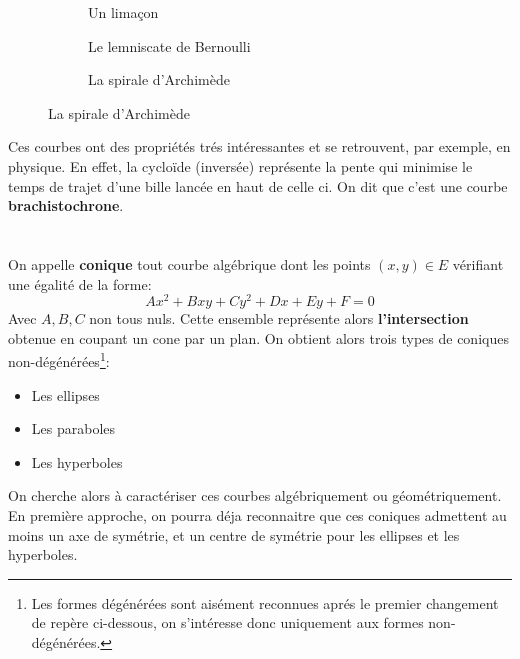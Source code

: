 \begin{figure}[h]
\begin{subfigure}{.3\textwidth}
      \caption*{Un limaçon}
   \end{subfigure}\quad
   \begin{subfigure}{.3\textwidth}
      \centering
      \caption*{Le lemniscate de Bernoulli}
   \end{subfigure}\quad
   \begin{subfigure}{.3\textwidth}
      \centering
      \caption*{La spirale d'Archimède}
   \end{subfigure}\quad
\end{figure}

Ces courbes ont des propriétés trés intéressantes et se retrouvent, par exemple, en physique. En effet, la cycloïde (inversée) représente la pente qui minimise le temps de trajet d'une bille lancée en haut de celle ci. On dit que c'est une courbe \textbf{brachistochrone}.

\subsection*{}
\chapter*{} %
On appelle \textbf{conique} tout courbe algébrique dont les points \((x, y) \in E\) vérifiant une égalité de la forme:
\[
   Ax^2 + Bxy + Cy^2 + Dx + Ey + F = 0  
\]
Avec \(A, B, C\) non tous nuls. Cette ensemble représente alors \textbf{l'intersection} obtenue en coupant un cone par un plan. On obtient alors trois types de coniques non-dégénérées\footnote[1]{Les formes dégénérées sont aisément reconnues aprés le premier changement de repère ci-dessous, on s'intéresse donc uniquement aux formes non-dégénérées.}:
\begin{itemize}
   \item Les ellipses
   \item Les paraboles
   \item Les hyperboles
\end{itemize}
On cherche alors à caractériser ces courbes algébriquement ou géométriquement. En première approche, on pourra déja reconnaitre que ces coniques admettent au moins un axe de symétrie, et un centre de symétrie pour les ellipses et les hyperboles.

